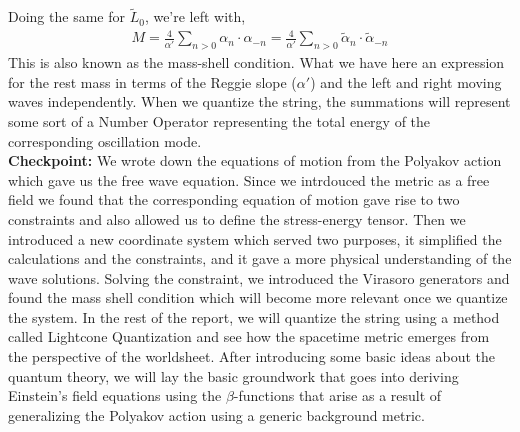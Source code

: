 \documentclass{article}
\begin{document}
Doing the same for $\tilde{L}_0$, we're left with,
\begin{align}
	M = \frac{4}{\alpha'}\sum_{n>0}\alpha_n\cdot\alpha_{-n}=\frac{4}{\alpha'}\sum_{n>0}\tilde{\alpha}_n\cdot\tilde{\alpha}_{-n}\label{eq:levelmatching}
\end{align}
This is also known as the mass-shell condition. What we have here an expression for the rest mass in terms of the Reggie slope ($\alpha'$) and the left and right moving waves independently. When we quantize the string, the summations will represent some sort of a Number Operator representing the total energy of the corresponding oscillation mode.\\

\textbf{Checkpoint:} We wrote down the equations of motion from the Polyakov action which gave us the free wave equation. Since we intrdouced the metric as a free field we found that the corresponding equation of motion gave rise to two constraints and also allowed us to define the stress-energy tensor. Then we introduced a new coordinate system which served two purposes, it simplified the calculations and the constraints, and it gave a more physical understanding of the wave solutions. Solving the constraint, we introduced the Virasoro generators and found the mass shell condition which will become more relevant once we quantize the system. In the rest of the report, we will quantize the string using a method called Lightcone Quantization and see how the spacetime metric emerges from the perspective of the worldsheet. After introducing some basic ideas about the quantum theory, we will lay the basic groundwork that goes into deriving Einstein's field equations using the $\beta$-functions that arise as a result of generalizing the Polyakov action using a generic background metric.
\end{document}
